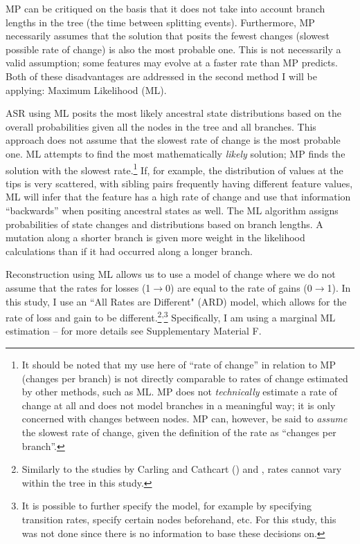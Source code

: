 \documentclass[12pt,letterpaper]{article}
\begin{document}
MP can be critiqued on the basis that it does not take into account branch lengths in the tree (the time between splitting events). Furthermore, MP necessarily assumes that the solution that posits the fewest changes (slowest possible rate of change) is also the most probable one. This is not necessarily a valid assumption; some features may evolve at a faster rate than MP predicts. Both of these disadvantages are addressed in the second method I will be applying: Maximum Likelihood (ML).

ASR using ML posits the most likely ancestral state distributions based on the overall probabilities given all the nodes in the tree and all branches. This approach does not assume that the slowest rate of change is the most probable one. ML attempts to find the most mathematically \textit{likely} solution; MP finds the solution with the slowest rate.\footnote{It should be noted that my use here of ``rate of change'' in relation to MP (changes per branch) is not directly comparable to rates of change estimated by other methods, such as ML. MP does not \textit{technically} estimate a rate of change at all and does not model branches in a meaningful way; it is only concerned with changes between nodes. MP can, however, be said to \textit{assume} the slowest rate of change, given the definition of the rate as ``changes per branch''.} If, for example, the distribution of values at the tips is very scattered, with sibling pairs frequently having different feature values, ML will infer that the feature has a high rate of change and use that information ``backwards'' when positing ancestral states as well. The ML algorithm assigns probabilities of state changes and distributions based on branch lengths. A mutation along a shorter branch is given more weight in the likelihood calculations than if it had occurred along a longer branch. 

Reconstruction using ML allows us to use a model of change where we do not assume that the rates for losses (1$\rightarrow$0) are equal to the rate of gains (0$\rightarrow$1). In this study, I use an ``All Rates are Different" (ARD) model, which allows for the rate of loss and gain to be different.\footnote{Similarly to the studies by Carling and Cathcart (\citeyear{carling2021reconstructing}) and \citet{goldstein_2022}, rates cannot vary within the tree in this study.}\textsuperscript{,}\footnote{It is possible to further specify the model, for example by specifying transition rates, specify certain nodes beforehand, etc. For this study, this was not done since there is no information to base these decisions on.} Specifically, I am using a marginal ML estimation -- for more details see Supplementary Material F.
\end{document}
